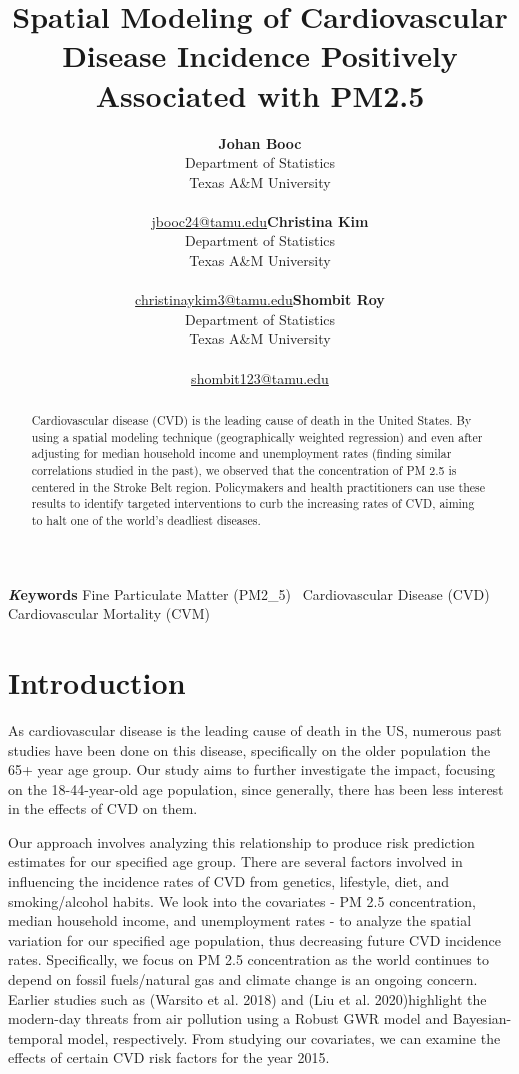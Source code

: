 \documentclass[
]{article}
\title{Spatial Modeling of Cardiovascular Disease Incidence Positively
Associated with PM2.5}
\author{\textbf{Johan Booc}\\Department of Statistics\\Texas A\&M
University\\\\\href{mailto:jbooc24@tamu.edu}{jbooc24@tamu.edu}\asep\textbf{Christina
Kim}\\Department of Statistics\\Texas A\&M
University\\\\\href{mailto:christinaykim3@tamu.edu}{christinaykim3@tamu.edu}\asep\textbf{Shombit
Roy}\\Department of Statistics\\Texas A\&M
University\\\\\href{mailto:shombit123@tamu.edu}{shombit123@tamu.edu}}
\date{}
\begin{document}
\maketitle
\begin{abstract}
Cardiovascular disease (CVD) is the leading cause of death in the United
States. By using a spatial modeling technique (geographically weighted
regression) and even after adjusting for median household income and
unemployment rates (finding similar correlations studied in the past),
we observed that the concentration of PM 2.5 is centered in the Stroke
Belt region. Policymakers and health practitioners can use these results
to identify targeted interventions to curb the increasing rates of CVD,
aiming to halt one of the world's deadliest diseases.
\end{abstract}
{\bfseries \emph Keywords}
\def\sep{\textbullet\ }
Fine Particulate Matter (PM2\_5) \sep Cardiovascular Disease (CVD) \sep 
Cardiovascular Mortality (CVM)


\section{Introduction}\label{sec-intro}

As cardiovascular disease is the leading cause of death in the US,
numerous past studies have been done on this disease, specifically on
the older population the 65+ year age group. Our study aims to further
investigate the impact, focusing on the 18-44-year-old age population,
since generally, there has been less interest in the effects of CVD on
them.~

Our approach involves analyzing this relationship to produce risk
prediction estimates for our specified age group. There are several
factors involved in influencing the incidence rates of CVD from
genetics, lifestyle, diet, and smoking/alcohol habits. We look into the
covariates - PM 2.5 concentration, median household income, and
unemployment rates - to analyze the spatial variation for our specified
age population, thus decreasing future CVD incidence rates.
Specifically, we focus on PM 2.5 concentration as the world continues to
depend on fossil fuels/natural gas and climate change is an ongoing
concern. Earlier studies such as (Warsito et al. 2018) and (Liu et al.
2020)highlight the modern-day threats from air pollution using a Robust
GWR model and Bayesian-temporal model, respectively. From studying our
covariates, we can examine the effects of certain CVD risk factors for
the year 2015.~
\end{document}
